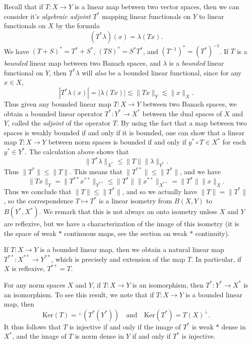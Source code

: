 Recall that if $T: X \to Y$ is a linear map between two vector spaces, then we can consider it's \emph{algebraic adjoint} $T^*$ mapping linear functionals on $Y$ to linear functionals on $X$ by the formula
%
\[ (T^* \lambda)(x) = \lambda(Tx). \]
%
We have $(T+S)^* = T^* + S^*$, $(TS)^* = S^* T^*$, and $(T^{-1})^* = (T^*)^{-1}$. If $T$ is a \emph{bounded} linear map between two Banach spaces, and $\lambda$ is a \emph{bounded} linear functional on $Y$, then $T^* \lambda$ will \emph{also} be a bounded linear functional, since for any $x \in X$,
%
\[ |T^* \lambda(x)| = |\lambda (Tx) | \lesssim \| Tx \|_Y \lesssim \| x \|_X. \]
%
Thus given any bounded linear map $T: X \to Y$ between two Banach spaces, we obtain a bounded linear operator $T^*: Y^* \to X^*$ between the dual spaces of $X$ and $Y$, called the \emph{adjoint} of the operator $T$. By using the fact that a map between two spaces is weakly bounded if and only if it is bounded, one can show that a linear map $T: X \to Y$ between norm spaces is bounded if and only if $y^* \circ T \in X^*$ for each $y^* \in Y^*$. The calculation above shows that
%
\[ \| T^* \lambda \|_{X^*} \leq \| T \| \| \lambda \|_{Y^*}. \]
%
Thus $\| T^* \| \leq \| T \|$. This means that $\| T^{**} \| \leq \| T^* \|$, and we have
%
\[ \| Tx \|_Y = \| T^{**} x^{**} \|_{Y^{**}} \leq \| T^* \| \| x^{**} \|_{X^{**}} = \| T^* \| \| x \|_X. \]
%
Thus we conclude that $\| T \| \leq \| T^* \|$, and so we actually have $\| T \| = \| T^* \|$, so the correspondence $T \mapsto T^*$ is a linear isometry from $B(X,Y)$ to $B(Y^*,X^*)$. We remark that this is not always an onto isometry unless $X$ and $Y$ are reflexive, but we have a characterization of the image of this isometry (it is the space of weak $*$ continuous maps, see the section on weak $*$ continuity).

If $T: X \to Y$ is a bounded linear map, then we obtain a natural linear map $T^{**}: X^{**} \to Y^{**}$, which is precisely and extension of the map $T$. In particular, if $X$ is reflexive, $T^{**} = T$.

For any norm spaces $X$ and $Y$, if $T: X \to Y$ is an isomorphism, then $T^*: Y^* \to X^*$ is an isomorphism. To see this result, we note that if $T: X \to Y$ is a bounded linear map, then
%
\[ \text{Ker}(T) = {}^\perp (T^*(Y^*)) \quad\text{and}\quad \text{Ker}(T^*) = T(X)^\perp. \]
%
It thus follows that $T$ is injective if and only if the image of $T^*$ is weak $*$ dense in $X^*$, and the image of $T$ is norm dense in $Y$ if and only if $T^*$ is injective.

